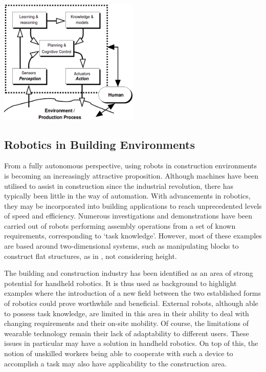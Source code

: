 \documentclass[11pt]{article}
\begin{document}
\begin{center}
\includegraphics[width = 0.5\textwidth]{cognitivearchitecture.png}
\label{figure:cognitivearchitecture}
\end{center}

\pagebreak














\subsection{Robotics in Building Environments} \label{building}

From a fully autonomous perspective, using robots in construction environments is becoming an increasingly attractive proposition. Although machines have been utilised to assist in construction since the industrial revolution, there has typically been little in the way of automation. With advancements in robotics, they may be incorporated into building applications to reach unprecedented levels of speed and efficiency. Numerous investigations and demonstrations have been carried out of robots performing assembly operations from a set of known requirements, corresponding to `task knowledge'. However, most of these examples are based around two-dimensional systems, such as manipulating blocks to construct flat structures, as in \cite{werfel2006}, not considering height.

The building and construction industry has been identified as an area of strong potential for handheld robotics. It is thus used as background to highlight examples where the introduction of a new field between the two established forms of robotics could prove worthwhile and beneficial. External robots, although able to possess task knowledge, are limited in this area in their ability to deal with changing requirements and their on-site mobility. Of course, the limitations of wearable technology remain their lack of adaptability to different users. These issues in particular may have a solution in handheld robotics. On top of this, the notion of unskilled workers being able to cooperate with such a device to accomplish a task may also have applicability to the construction area.
\end{document}
